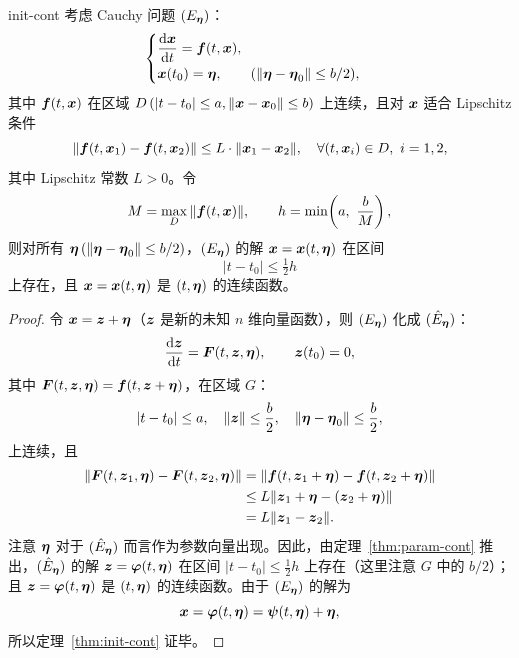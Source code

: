 \begin{theorem}{}{init-cont}
	考虑 Cauchy 问题 $(E_{\boldsymbol{\eta}})$：
	\[
		\begin{cases}
			\dfrac{\mathrm{d} \boldsymbol{x}}{\mathrm{d} t} = \boldsymbol{f}(t, \boldsymbol{x}), \\[4pt]
			\boldsymbol{x}(t_0) = \boldsymbol{\eta}, \qquad (\|\boldsymbol{\eta} - \boldsymbol{\eta}_0\| \leq b/2),
		\end{cases}
	\]
	其中 $\boldsymbol{f}(t, \boldsymbol{x})$ 在区域 $D\,(|t - t_0| \leq a, \|\boldsymbol{x} - \boldsymbol{x}_0\| \leq b)$ 上连续，且对 $\boldsymbol{x}$ 适合 Lipschitz 条件
	\[
		\|\boldsymbol{f}(t, \boldsymbol{x}_1) - \boldsymbol{f}(t, \boldsymbol{x}_2)\| \leq L \cdot \|\boldsymbol{x}_1 - \boldsymbol{x}_2\|,
		\quad \forall(t, \boldsymbol{x}_i) \in D,\ i = 1,2,
	\]
	其中 Lipschitz 常数 $L > 0$。令
	\[
		M = \max_D \|\boldsymbol{f}(t, \boldsymbol{x})\|, \qquad 
		h = \min\!\left(a,\ \frac{b}{M}\right),
	\]
	则对所有 $\boldsymbol{\eta}\,(\|\boldsymbol{\eta} - \boldsymbol{\eta}_0\| \leq b/2)$，$(E_{\boldsymbol{\eta}})$ 的解 $\boldsymbol{x} = \boldsymbol{x}(t, \boldsymbol{\eta})$ 在区间
	\[
		|t - t_0| \leq \tfrac{1}{2}h
	\]
	上存在，且 $\boldsymbol{x} = \boldsymbol{x}(t, \boldsymbol{\eta})$ 是 $(t, \boldsymbol{\eta})$ 的连续函数。
\end{theorem}

\begin{proof}
	令 $\boldsymbol{x} = \boldsymbol{z} + \boldsymbol{\eta}$（$\boldsymbol{z}$ 是新的未知 $n$ 维向量函数），则 $(E_{\boldsymbol{\eta}})$ 化成 $(\hat{E}_{\boldsymbol{\eta}})$：
	\[
		\frac{\mathrm{d} \boldsymbol{z}}{\mathrm{d} t} = \boldsymbol{F}(t, \boldsymbol{z}, \boldsymbol{\eta}), \qquad \boldsymbol{z}(t_0) = 0,
	\]
	其中 $\boldsymbol{F}(t, \boldsymbol{z}, \boldsymbol{\eta}) = \boldsymbol{f}(t, \boldsymbol{z} + \boldsymbol{\eta})$，在区域 $G$：
	\[
		|t - t_0| \leq a,\quad \|\boldsymbol{z}\| \leq \frac{b}{2},\quad \|\boldsymbol{\eta} - \boldsymbol{\eta}_0\| \leq \frac{b}{2},
	\]
	上连续，且
	\begin{align*}
		\|\boldsymbol{F}(t, \boldsymbol{z}_1, \boldsymbol{\eta}) - \boldsymbol{F}(t, \boldsymbol{z}_2, \boldsymbol{\eta})\| 
		&= \|\boldsymbol{f}(t, \boldsymbol{z}_1 + \boldsymbol{\eta}) - \boldsymbol{f}(t, \boldsymbol{z}_2 + \boldsymbol{\eta})\| \\
		&\leq L\|\boldsymbol{z}_1 + \boldsymbol{\eta} - (\boldsymbol{z}_2 + \boldsymbol{\eta})\| \\
		&= L\|\boldsymbol{z}_1 - \boldsymbol{z}_2\|.
	\end{align*}
	注意 $\boldsymbol{\eta}$ 对于 $(\hat{E}_{\boldsymbol{\eta}})$ 而言作为参数向量出现。因此，由定理~\ref{thm:param-cont} 推出，$(\hat{E}_{\boldsymbol{\eta}})$ 的解 $\boldsymbol{z} = \boldsymbol{\varphi}(t, \boldsymbol{\eta})$ 在区间 $|t - t_0| \leq \tfrac{1}{2}h$ 上存在（这里注意 $G$ 中的 $b/2$）；且 $\boldsymbol{z} = \boldsymbol{\varphi}(t, \boldsymbol{\eta})$ 是 $(t, \boldsymbol{\eta})$ 的连续函数。由于 $(E_{\boldsymbol{\eta}})$ 的解为
	\[
		\boldsymbol{x} = \boldsymbol{\varphi}(t, \boldsymbol{\eta}) = \boldsymbol{\psi}(t, \boldsymbol{\eta}) + \boldsymbol{\eta},
	\]
	所以定理~\ref{thm:init-cont} 证毕。
\end{proof}

